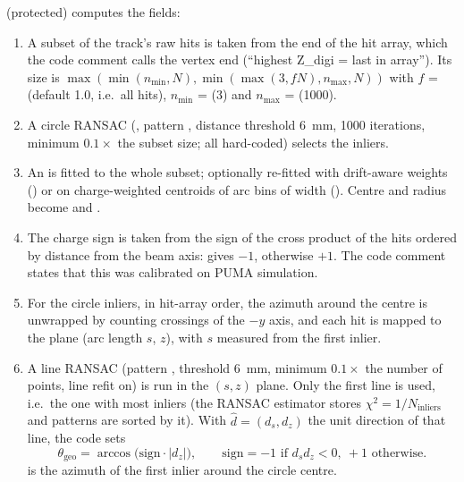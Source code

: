  (protected) computes the  fields:
\begin{enumerate}
\item A subset of the track's raw hits is taken from the end of the hit array, which the code comment
  calls the vertex end (``highest Z\_digi = last in array''). Its size is
  $\max(\min(n_\mathrm{min},N), \min(\max(3, fN), n_\mathrm{max}, N))$ with $f$ =
   (default 1.0, i.e.\ all hits), $n_\mathrm{min}$ = 
  (3) and $n_\mathrm{max}$ =  (1000).
\item A circle RANSAC (, pattern , distance threshold 6~mm,
  1000 iterations, minimum $0.1\times$ the subset size; all hard-coded) selects the inliers.
\item An  is fitted to the whole subset; optionally re-fitted with drift-aware
  weights () or on charge-weighted centroids of arc bins of width
   (). Centre and radius become  and
  .
\item The charge sign is taken from the sign of the cross product of the hits ordered by distance from the
  beam axis:  gives $-1$, otherwise $+1$. The code comment states that this was
  calibrated on PUMA simulation.
\item For the circle inliers, in hit-array order, the azimuth around the centre is unwrapped by counting
  crossings of the $-y$ axis, and each hit is mapped to the plane (arc length $s$, $z$), with $s$ measured
  from the first inlier.
\item A line RANSAC (pattern , threshold 6~mm, minimum $0.1\times$ the number of points, line
  refit on) is run in the $(s,z)$ plane. Only the first line is used, i.e.\ the one with most inliers
  (the RANSAC estimator stores $\chi^2 = 1/N_\mathrm{inliers}$ and patterns are sorted by it). With
  $\hat d=(d_s,d_z)$ the unit direction of that line, the code sets
  \[
  \theta_\mathrm{geo} = \arccos\bigl(\mathrm{sign}\cdot|d_z|\bigr),\qquad
  \mathrm{sign} = -1 \text{ if } d_s d_z < 0,\ +1 \text{ otherwise.}
  \]
   is the azimuth of the first inlier around the circle centre.
\end{enumerate}

